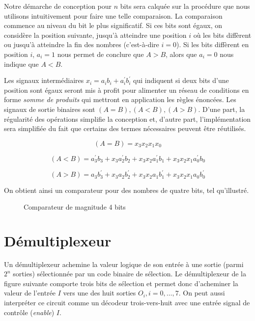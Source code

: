 \documentclass[letter, oneside]{book}
\begin{document}
Notre démarche de conception pour \(n\) bits sera calquée sur la
procédure que nous utilisons intuitivement pour faire une telle
comparaison. La comparaison commence au niveau du bit le plus
significatif. Si ces bits sont égaux, on considère la position
suivante, jusqu'à atteindre une position \(i\) où les bits diffèrent
ou jusqu'à atteindre la fin des nombres (c'est-à-dire \(i=0\)). Si les
bits diffèrent en position \(i\), \(a_i = 1\) nous permet de conclure
que \(A > B\), alors que \(a_i = 0\) nous indique que \(A < B\).

Les signaux intermédiaires \(x_i = a_i b_i + a_i^\prime b_i^\prime\)
qui indiquent si deux bits d'une position sont égaux seront mis à
profit pour alimenter un réseau de conditions en forme \emph{somme de
produits} qui mettront en application les règles énoncées. Les signaux
de sortie binaires sont \((A = B), (A < B), (A > B)\).  D'une part,
la régularité des opérations simplifie la conception et, d'autre part,
l'implémentation sera simplifiée du fait que certains des termes
nécessaires peuvent être réutilisés.

$$ (A = B) = x_3 x_2 x_1 x_0 $$ 

$$ (A < B) = a_3^\prime b_3 + x_3  a_2^\prime b_2  +  x_3 x_2  a_1^\prime b_1 +  x_3 x_2 x_1  a_0^\prime b_0 $$

$$ (A > B) = a_3 b_3^\prime + x_3  a_2 b_2^\prime  +  x_3 x_2  a_1 b_1^\prime +  x_3 x_2 x_1  a_0 b_0^\prime $$

On obtient ainsi un comparateur pour des nombres de quatre bits, tel qu'illustré.

\begin{figure}[htbp]
\centering

\caption{\label{fig:org686cd83}Comparateur de magnitude 4 bits}
\end{figure}

\section{Démultiplexeur}
\label{sec:org13a89c9}

Un démultiplexeur achemine la valeur logique de son entrée à une
sortie (parmi \(2^n\) sorties) sélectionnée par un code binaire de
sélection. Le démultiplexeur de la figure suivante comporte trois bits
de sélection et permet donc d'acheminer la valeur de l'entrée \(I\)
vers une des huit sorties \(O_i, i = 0, \ldots, 7\). On peut aussi
interpréter ce circuit comme un décodeur trois-vers-huit avec une
entrée signal de contrôle (\emph{enable}) \(I\).
\end{document}
